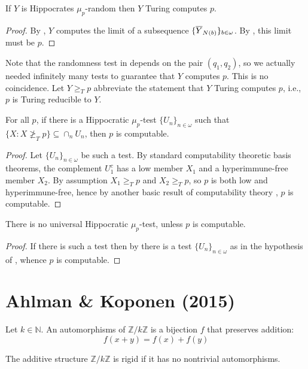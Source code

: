\begin{corollary}\label{Hippo_compute}
If $Y$ is Hippocrates $\mu_p$-random then $Y$ Turing computes $p$.
\end{corollary}
\begin{proof}
By , $Y$ computes the limit of a subsequence $\{\overline Y_{N(b)}\}_{b\in\omega}$. By , this limit must be $p$.
\end{proof}

Note that the randomness test in  depends on the pair $(q_1,q_2)$, so we actually needed infinitely many tests to guarantee that $Y$ computes $p$. This is no coincidence. Let $Y\ge_T p$ abbreviate the statement that $Y$ Turing computes $p$, i.e., $p$ is Turing reducible to $Y$.
        
\begin{theorem}\label{not_compute_test}
For all $p$, if there is a Hippocratic $\mu_p$-test $\{U_n\}_{n\in\omega}$ such that $\{X:X\not\ge_T p\}\subseteq\cap_n U_n$, then $p$ is computable.
\end{theorem}
\begin{proof}
Let $\{U_n\}_{n\in\omega}$ be such a test. By standard computability theoretic basis theorems, the complement $U_1^c$ has a low member $X_1$ and a hyperimmune-free member $X_2$. By assumption $X_1\ge_T p$ and $X_2\ge_T p$, so $p$ is both low and hyperimmune-free, hence by another basic result of computability theory \cite{Soare}, $p$ is computable.
\end{proof}

\begin{corollary}\label{noUniv}
There is no universal Hippocratic $\mu_p$-test, unless $p$ is computable. 
\end{corollary}
\begin{proof}
If there is such a test then by  there is a test $\{U_n\}_{n\in\omega}$ as in the hypothesis of , whence $p$ is computable.
\end{proof}



\chapter{Ahlman \& Koponen (2015)}
\begin{definition}
	\label{def:auto}
	Let $k\in\mathbb N$.
	An automorphisms of $\mathbb Z/ k\mathbb Z$ is a bijection $f$ that preserves addition:
	\[
	f(x+y)=f(x)+f(y)
	\]
\end{definition}
\begin{definition}
	\label{def:rigid}
	\leanok
	The additive structure $\mathbb Z/ k\mathbb Z$ is rigid if it has no nontrivial automorphisms.
\end{definition}



